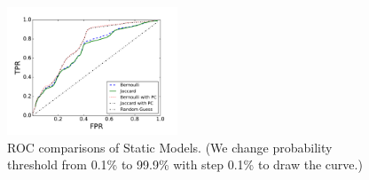 \begin{figure}[t!]
\begin{center}
\includegraphics[width=2in]{figure/predict}
\vspace{-0.1in}
\caption{ROC comparisons of Static Models. 
(We change probability threshold from 0.1\% to 99.9\% with step 0.1\% to draw the curve.)
}
\label{fig:predict}
\end{center}
\vspace{-0.1in}
\end{figure}